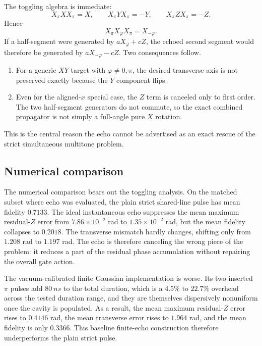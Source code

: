 \documentclass[aps,pra,twocolumn,reprint,floatfix,amsmath,amssymb]{revtex4-2}
\begin{document}
The toggling algebra is immediate:
\begin{equation}
X_{\pi} X X_{\pi}=X,
\qquad
X_{\pi} Y X_{\pi}=-Y,
\qquad
X_{\pi} Z X_{\pi}=-Z.
\label{eq:echoalgebra}
\end{equation}
Hence
\begin{equation}
X_{\pi} X_{\varphi} X_{\pi}=X_{-\varphi}.
\end{equation}
If a half-segment were generated by \(aX_{\varphi}+cZ\), the echoed second segment would therefore be generated by \(aX_{-\varphi}-cZ\). Two consequences follow.
\begin{enumerate}
  \item For a generic \(XY\) target with \(\varphi \neq 0,\pi\), the desired transverse axis is not preserved exactly because the \(Y\) component flips.
  \item Even for the aligned-\(x\) special case, the \(Z\) term is canceled only to first order. The two half-segment generators do not commute, so the exact combined propagator is not simply a full-angle pure \(X\) rotation.
\end{enumerate}

This is the central reason the echo cannot be advertised as an exact rescue of the strict simultaneous multitone problem.

\subsection{Numerical comparison}

The numerical comparison bears out the toggling analysis. On the matched subset where echo was evaluated, the plain strict shared-line pulse has mean fidelity \(0.7133\). The ideal instantaneous echo suppresses the mean maximum residual-\(Z\) error from \(7.86\times10^{-2}\) rad to \(1.35\times10^{-2}\) rad, but the mean fidelity collapses to \(0.2018\). The transverse mismatch hardly changes, shifting only from \(1.208\) rad to \(1.197\) rad. The echo is therefore canceling the wrong piece of the problem: it reduces a part of the residual phase accumulation without repairing the overall gate action.

The vacuum-calibrated finite Gaussian implementation is worse. Its two inserted \(\pi\) pulses add \(\SI{80}{ns}\) to the total duration, which is a \(4.5\%\) to \(22.7\%\) overhead across the tested duration range, and they are themselves dispersively nonuniform once the cavity is populated. As a result, the mean maximum residual-\(Z\) error rises to \(0.4146\) rad, the mean transverse error rises to \(1.964\) rad, and the mean fidelity is only \(0.3366\). This baseline finite-echo construction therefore underperforms the plain strict pulse.
\end{document}
